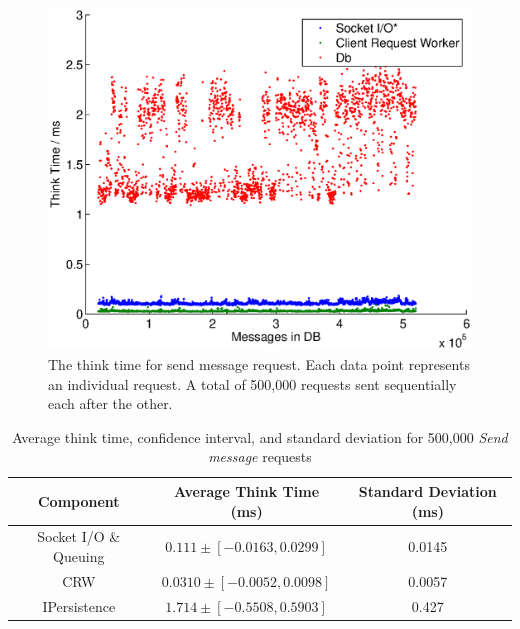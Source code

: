 \documentclass{article}
\begin{document}
                \begin{figure}[H]
                \centering
                    \centerline{\includegraphics[scale=0.50]{thinktime_500k_push}}
                    \caption{The think time for send message request. Each data point represents an individual request. A total of 500,000 requests sent sequentially each after the other.}
                    \label{fig:thinktime_500k_push}
                \end{figure}
                \begin{table}[H]
                    \centering
                    \begin{tabular}{|c|c|c|}
                        \hline 
                        \textbf{Component} & \textbf{Average Think Time} (ms) & \textbf{Standard Deviation (ms)} \\ 
                        \hline 
                        Socket I/O \& Queuing & $0.111 \pm [-0.0163 , 0.0299]$ &0.0145\\ 
                        \hline 
                        CRW & $0.0310 \pm [-0.0052 , 0.0098]$ &0.0057\\ 
                        \hline 
                        IPersistence & $1.714 \pm [-0.5508 , 0.5903]$ &0.427\\ 
                        \hline 
                    \end{tabular}
                    \caption{Average think time, confidence interval, and standard deviation for 500,000 \textit{Send message} requests}
                    \label{table:thinktime_500k_push}
                \end{table} 
                
\end{document}
